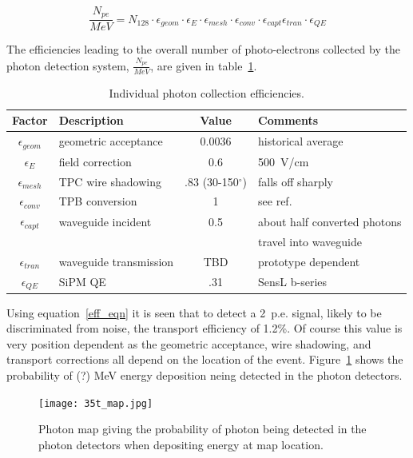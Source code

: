 \begin{equation}\label{eff_eqn}
\frac{N_{pe}}{MeV} = N_{128}\cdot \epsilon_{geom} \cdot \epsilon_{E} \cdot
\epsilon_{mesh} \cdot \epsilon_{conv} \cdot \epsilon_{capt}
\epsilon_{tran} \cdot \epsilon_{QE} 
\end{equation}

The efficiencies leading to the overall number of photo-electrons
collected by the photon detection system, $\frac{N_{pe}}{MeV}$, are given
in table~\ref{Table-Eff}.

\begin{table}[ht]
  \begin{center}
    \caption{Individual photon collection efficiencies.}
    \label{Table-Eff}
    \begin{tabular}{ c | l | c | l }
      \hline
      \hline
      Factor & Description & Value & Comments  \\
      \hline
      $\epsilon_{geom}$ & geometric acceptance & 0.0036 & historical
      average  \\
      $\epsilon_{E}$ & field correction & 0.6 & 500~V/cm  \\
      $\epsilon_{mesh}$ & TPC wire shadowing & .83 (30-150$^{\circ}$)
      & falls off sharply~\cite{HimmelMesh}  \\
      $\epsilon_{conv}$ & TPB conversion & 1 & see
      ref.~\cite{bib:gehman}  \\
      $\epsilon_{capt}$ & waveguide incident & 0.5 & about half
      converted photons\\
      &  & & travel into waveguide  \\
      $\epsilon_{tran}$ & waveguide transmission & TBD  & prototype
      dependent  \\
     $\epsilon_{QE}$ & SiPM QE & .31  & SensL b-series  \\
      \hline
      \hline
    \end{tabular}
  \end{center}
\end{table}

Using equation~\ref{eff_eqn} it is seen that to detect a
2~p.e. signal, likely to be discriminated from noise, the transport
efficiency of 1.2\%. Of course this value is very position dependent
as the geometric acceptance, wire shadowing, and transport corrections
all depend on the location of the event. Figure~\ref{photon_map}
shows the probability of (?) MeV energy deposition neing detected in
the photon detectors. 

\begin{figure}[h!]
  \centering
  \texttt{[image: 35t\_map.jpg]}
\caption[Probability of photon being detected in
  detectors when depositing energy]{Photon map giving the probability of photon being detected in
  the photon detectors when depositing energy at map location. }
\label{photon_map}
\end{figure}

